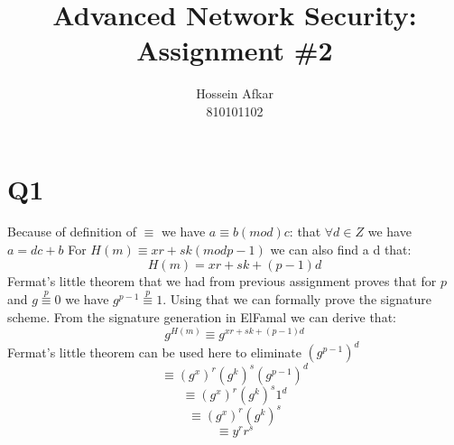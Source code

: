 \documentclass[a4paper, 11pt]{article}
\title{Advanced Network Security: Assignment \#2}
\author{Hossein Afkar \\ 810101102}
\begin{document}
\maketitle
\section{Q1}
Because of definition of $\equiv$ we have $a \equiv b (mod) c$: that
$\forall d \in Z$ we have $a = dc + b$
For $H(m) \equiv xr + sk (mod p - 1)$ we can also find a d that:
\begin{equation}
    H(m) = xr + sk + (p-1)d
\end{equation}
Fermat's little theorem that we had from previous assignment proves that
for $p$ and $g \stackrel{p}{\equiv} 0$ we have
$g^{p-1} \stackrel{p}{\equiv} 1$.
Using that we can formally prove the signature scheme. From the signature
generation in ElFamal we can derive that:
\begin{equation}
    g^{H(m)} \equiv g^{xr + sk + (p-1)d}
\end{equation}
Fermat's little theorem can be used here to eliminate $(g^{p-1})^d$
\begin{equation}
    \equiv (g^{x})^{r} (g^{k})^s (g^{p-1})^{d}
\end{equation}
\begin{equation}
    \equiv (g^{x})^{r} (g^{k})^s 1^d
\end{equation}
\begin{equation}
    \equiv (g^{x})^{r} (g^{k})^s
\end{equation}
\begin{equation}
    \equiv y^{r} r^s
\end{equation}
\end{document}
